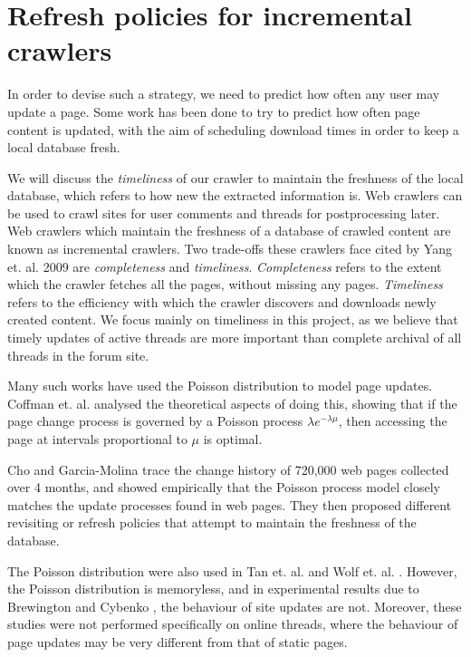 \section{Refresh policies for incremental crawlers}
In order to devise such a strategy, we need to predict how often any user may 
update a page. Some work has been done to try to predict how often page content 
is updated, with the aim of scheduling download times in order to keep a local 
database fresh.


We will discuss the \emph{timeliness} of our crawler to maintain the freshness 
of the local database, which refers to how new the extracted information is. Web 
crawlers can be used to crawl sites for user comments and threads for 
postprocessing later. Web crawlers which maintain the freshness of a database of 
crawled content are known as incremental crawlers. Two trade-offs these crawlers 
face cited by Yang et. al. 2009 \cite{Yang2009} are \emph{completeness} and 
\emph{timeliness}. \emph{Completeness} refers to the extent which the crawler 
fetches all the pages, without missing any pages. \emph{Timeliness} refers to 
the efficiency with which the crawler discovers and downloads newly created 
content. We focus mainly on timeliness in this project, as we believe that 
timely updates of active threads are more important than complete archival of 
all threads in the forum site.

Many such works have used the Poisson distribution to model page updates.  
Coffman et. al. \cite{Coffman1997} analysed the theoretical aspects of doing 
this, showing that if the page change process is governed by a Poisson process 
$\lambda e^{-\lambda \mu}$, then accessing the page at intervals proportional to 
$\mu$ is optimal.

Cho and Garcia-Molina trace the change history of 720,000 web pages collected 
over 4 months, and showed empirically that the Poisson process model closely 
matches the update processes found in web pages\cite{Cho1999}. They then 
proposed different revisiting or refresh policies 
\cite{Cho2003,Garcia-molina2003} that attempt to maintain the freshness of the 
database.

The Poisson distribution were also used in Tan et. al. \cite{Tan2007} and Wolf 
et. al. \cite{Wolf2002}. %
However, the Poisson distribution is memoryless, and in experimental results due 
to Brewington and Cybenko \cite{Brian2000}, the behaviour of site updates are 
not. Moreover, these studies were not performed specifically on online threads, 
where the behaviour of page updates may be very different from that of static 
pages.

